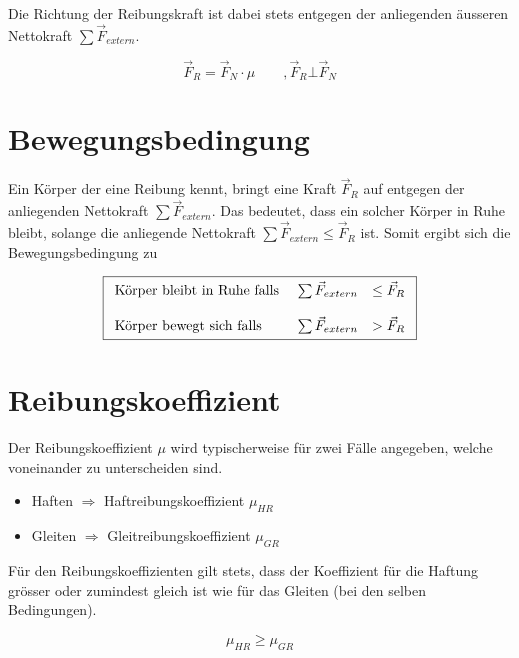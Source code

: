 \noindent
Die Richtung der Reibungskraft ist dabei stets entgegen der 
anliegenden äusseren Nettokraft 
$\sum \vec{F}_{extern}$.

\[ \boxed{
	\vec{F}_R = \vec{F}_N \cdot \mu
		\qquad ,\vec{F}_R \bot \vec{F}_N
}\]

\section{Bewegungsbedingung}
\noindent
Ein Körper der eine Reibung kennt, bringt eine Kraft $\vec{F}_R$ 
auf entgegen der anliegenden Nettokraft $\sum \vec{F}_{extern}$. 
Das bedeutet, dass ein solcher Körper in Ruhe bleibt, solange die 
anliegende Nettokraft $\sum \vec{F}_{extern} \leq \vec{F}_R$ ist. 
Somit ergibt sich die Bewegungsbedingung zu

\[ \boxed{\begin{array}{l r l}
	\text{Körper bleibt in Ruhe falls } & 
		\sum \vec{F}_{extern} & \leq \vec{F}_R \\
	& & \\
	\text{Körper bewegt sich falls } &
		\sum \vec{F}_{extern} & > \vec{F}_R 
\end{array}} \]

\section{Reibungskoeffizient}
Der Reibungskoeffizient $\mu$ wird typischerweise für zwei Fälle 
angegeben, welche voneinander zu unterscheiden sind.
\begin{itemize}
	\item Haften $\Rightarrow$ Haftreibungskoeffizient $\mu_{HR}$
	\item Gleiten $\Rightarrow$ Gleitreibungskoeffizient $\mu_{GR}$
\end{itemize}

\noindent
Für den Reibungskoeffizienten gilt stets, dass der Koeffizient für die
Haftung grösser oder zumindest gleich ist wie für das Gleiten 
(bei den selben Bedingungen).

\[ \boxed{
	\mu_{HR} \geq \mu_{GR}
}\]

